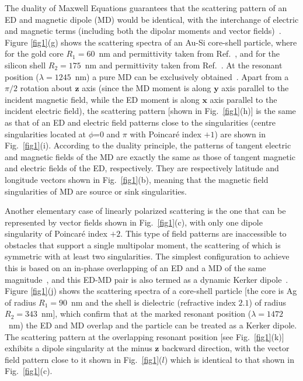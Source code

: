 \documentclass[aps,twocolumn,superscriptaddress]{revtex4-1}
\newcounter{Fig}
\begin{document}
The duality of Maxwell Equations guarantees that the scattering pattern of an ED and magnetic dipole (MD) would be identical, with the interchange of electric and magnetic terms (including both the dipolar moments and vector fields)~\cite{jackson1962classical}. Figure \ref{fig1}(g) shows the scattering spectra of an Au-Si core-shell particle, where for the gold core $R_1=60$~nm and permittivity taken from Ref.~\cite{Johnson1972_PRB}, and for the silicon shell $R_2=175$~nm and permittivity taken from Ref.~\cite{PALIK_1998__Handbook}. At the resonant position ($\lambda=1245$~nm) a pure MD can be exclusively obtained~\cite{liu_toroidal_2015,FENG_2017_Phys.Rev.Lett._Ideal}.  Apart from a $\pi/2$ rotation about $\textbf{z}$ axis (since the MD moment is along $\textbf{y}$ axis parallel to the incident magnetic field, while the ED moment is along $\textbf{x}$ axis parallel to the incident electric field), the scattering pattern [shown in Fig.~\ref{fig1}(h)] is the same as that of an ED and electric field patterns close to the singularities (centre singularities located at $\phi$=0 and $\pi$ with Poincar\'{e} index $+1$) are shown in Fig.~\ref{fig1}(i). According to the duality principle, the patterns of tangent electric and magnetic fields of the MD are exactly the same as those of tangent magnetic and electric fields of the ED, respectively.  They are respectively latitude and longitude vectors shown in Fig.~\ref{fig1}(b), meaning that the magnetic field singularities of MD are source or sink singularities.

Another elementary case of linearly polarized scattering is the one that can be represented by vector fields shown in Fig.~\ref{fig1}(c), with only one dipole singularity of Poincar\'{e} index $+2$. This type of field patterns are inaccessible to obstacles that support a single multipolar moment, the scattering of which is symmetric with at least two singularities. The simplest configuration to achieve this is based on an in-phase overlapping of an ED and a MD of the same magnitude~\cite{LIU_2018_Opt.Express_Generalized,Liu2012_ACSNANO,CHEN_2019__Singularities}, and this ED-MD pair is also termed as a dynamic Kerker dipole~\cite{Kerker1983_JOSA,LIU_2018_Opt.Express_Generalized,CHEN_2019__Singularities}. Figure \ref{fig1}(j) shows the scattering spectra of a core-shell particle [the core is Ag of radius $R_1=90$~nm and the shell is dielectric (refractive index $2.1$) of radius $R_2=343$~nm], which confirm that at the marked resonant position ($\lambda=1472$~nm) the ED and MD overlap and the particle can be treated as a Kerker dipole.   The scattering  pattern at the overlapping resonant position [see Fig.~\ref{fig1}(k)] exhibits a dipole singularity at the minus $\textbf{z}$ backward direction, with the vector field  pattern close to it shown in Fig.~\ref{fig1}($l$) which is identical to that shown in Fig.~\ref{fig1}(c).
\end{document}

